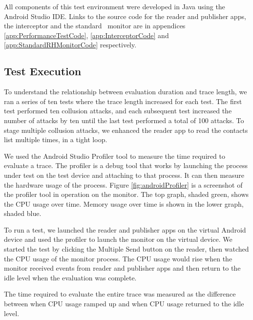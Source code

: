 All components of this test environment were developed in Java using the Android Studio IDE.  Links to the source code for the reader and publisher apps, the interceptor and the standard \RH\ monitor are in appendices \ref{app:PerformanceTestCode}, \ref{app:InterceptorCode} and \ref{app:StandardRHMonitorCode} respectively.

\newpage

\subsection{Test Execution}
\label{subsec:PracticalPerformanceAnalysisExecution}

To understand the relationship between evaluation duration and trace length, we ran a series of ten tests where the trace length increased for each test.  The first test performed ten collusion attacks, and each subsequent test increased the number of attacks by ten until the last test performed a total of 100 attacks.  To stage multiple collusion attacks, we enhanced the reader app to read the contacts list multiple times, in a tight loop.

We used the Android Studio Profiler tool to measure the time required to evaluate a trace.  The profiler is a debug tool that works by launching the process under test on the test device and attaching to that process.  It can then measure the hardware usage of the process.  Figure \ref{fig:androidProfiler} is a screenshot of the profiler tool in operation on the monitor.  The top graph, shaded green, shows the CPU usage over time.  Memory usage over time is shown in the lower graph, shaded blue.  

To run a test, we launched the reader and publisher apps on the virtual Android device and used the profiler to launch the monitor on the virtual device.  We started the test by clicking the Multiple Send button on the reader, then watched the CPU usage of the monitor process.  The CPU usage would rise when the monitor received events from reader and publisher apps and then return to the idle level when the evaluation was complete.

The time required to evaluate the entire trace was measured as the difference between when CPU usage ramped up and when CPU usage returned to the idle level.

